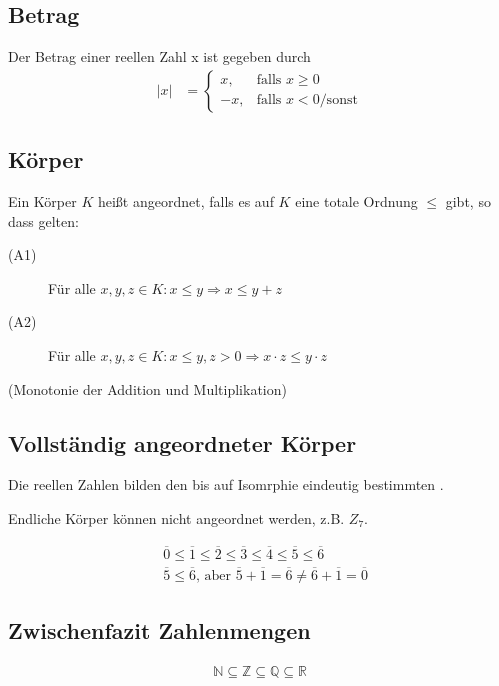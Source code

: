 \subsection{Betrag}
Der Betrag einer reellen Zahl x ist gegeben durch
\begin{align*}
|x| &= \left\{\begin{array}{cl} x, & \mbox{falls }x \geq 0\\ -x, & \mbox{falls } x < 0 \mbox{/sonst} \end{array}\right.
\end{align*}

\subsection{Körper}
Ein Körper $K$ heißt angeordnet, falls es auf $K$ eine totale Ordnung $\leq$ gibt, so dass gelten:
\begin{description}
\item[(A1)]{Für alle $x, y, z \in K : x \leq y \Rightarrow x \leq y + z$}
\item[(A2)]{Für alle $x, y, z \in K : x \leq y, z > 0 \Rightarrow x\cdot z \leq y\cdot z$}
\end{description}
(Monotonie der Addition und Multiplikation)

\subsection{Vollständig angeordneter Körper}
Die reellen Zahlen bilden den bis auf Isomrphie eindeutig bestimmten .

Endliche Körper können nicht angeordnet werden, z.B. $Z_7$.

\begin{align*}
&\overline{0} \leq \overline{1} \leq \overline{2} \leq \overline{3} \leq \overline{4} \leq \overline{5} \leq \overline{6} \\
&\overline{5} \leq \overline{6}\text{, aber }\overline{5} + \overline{1} = \overline{6} \neq \overline{6} + \overline{1} = \overline{0}
\end{align*}

\subsection{Zwischenfazit Zahlenmengen}
\begin{align*}
	\mathbb{N} \subseteq \mathbb{Z} \subseteq \mathbb{Q} \subseteq \mathbb{R}
\end{align*}


